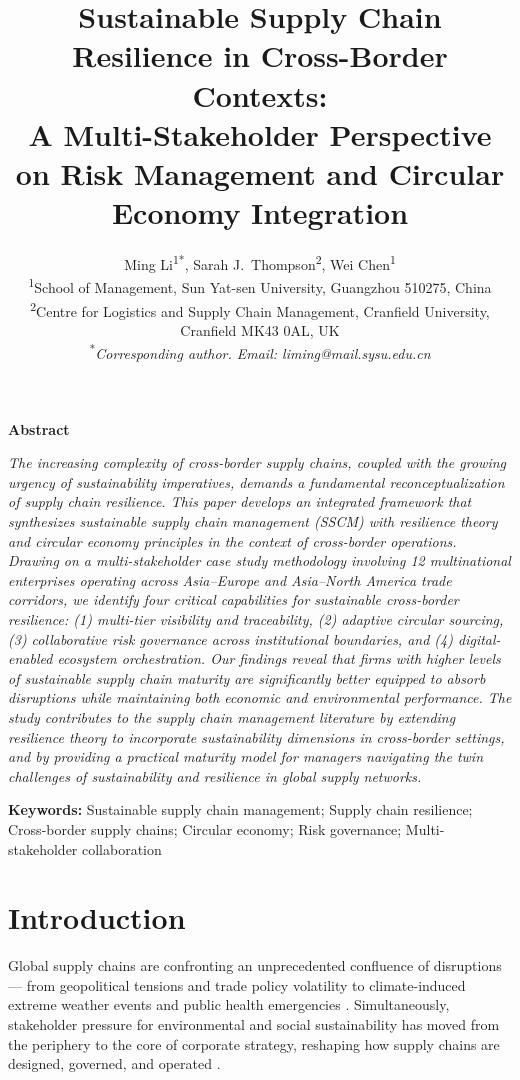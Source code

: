 \documentclass[12pt,a4paper,twoside]{article}
\title{\bfseries Sustainable Supply Chain Resilience in Cross-Border Contexts:\\[2mm]
       \large A Multi-Stakeholder Perspective on Risk Management and Circular Economy Integration}
\author{%
  Ming Li\textsuperscript{1*},
  Sarah J.~Thompson\textsuperscript{2},
  Wei Chen\textsuperscript{1}
  \\[2mm]
  \textsuperscript{1}School of Management, Sun Yat-sen University, Guangzhou 510275, China\\
  \textsuperscript{2}Centre for Logistics and Supply Chain Management, Cranfield University, Cranfield MK43 0AL, UK\\[2mm]
  \textsuperscript{*}\textit{Corresponding author. Email: liming@mail.sysu.edu.cn}
}
\date{}
\renewenvironment{abstract}
  {\small\bfseries\noindent Abstract\par\small\itshape}
  {\par\medskip}
\begin{document}
\maketitle

\begin{abstract}
The increasing complexity of cross-border supply chains, coupled with the growing
urgency of sustainability imperatives, demands a fundamental reconceptualization
of supply chain resilience. This paper develops an integrated framework that
synthesizes sustainable supply chain management (SSCM) with resilience theory
and circular economy principles in the context of cross-border operations.
Drawing on a multi-stakeholder case study methodology involving 12 multinational
enterprises operating across Asia--Europe and Asia--North America trade corridors,
we identify four critical capabilities for sustainable cross-border resilience:
(1) multi-tier visibility and traceability, (2) adaptive circular sourcing,
(3) collaborative risk governance across institutional boundaries, and
(4) digital-enabled ecosystem orchestration. Our findings reveal that firms with
higher levels of sustainable supply chain maturity are significantly better
equipped to absorb disruptions while maintaining both economic and environmental
performance. The study contributes to the supply chain management literature by
extending resilience theory to incorporate sustainability dimensions in
cross-border settings, and by providing a practical maturity model for managers
navigating the twin challenges of sustainability and resilience in global
supply networks.
\end{abstract}

\vspace{2mm}
\noindent\textbf{Keywords:} Sustainable supply chain management; Supply chain
resilience; Cross-border supply chains; Circular economy; Risk governance;
Multi-stakeholder collaboration

\section{Introduction}
\label{sec:introduction}

Global supply chains are confronting an unprecedented confluence of disruptions
--- from geopolitical tensions and trade policy volatility to climate-induced
extreme weather events and public health emergencies
\citep{ivanov2019global, pettit2019resilience}.  Simultaneously, stakeholder
pressure for environmental and social sustainability has moved from the
periphery to the core of corporate strategy, reshaping how supply chains are
designed, governed, and operated \citep{carter2008framework, seuring2013review}.
\end{document}
